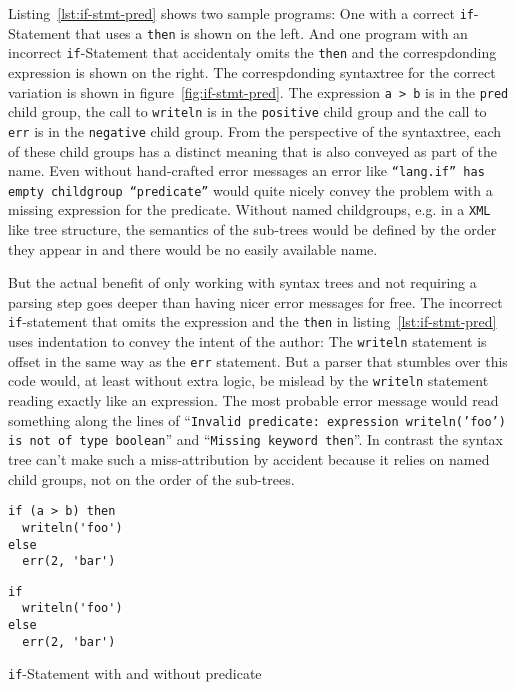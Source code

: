 \documentclass[sigconf,natbib=false,review=true]{acmart}
\begin{document}
Listing~\ref{lst:if-stmt-pred} shows two sample programs: One with a correct \texttt{if}-Statement that uses a \texttt{then} is shown on the left. And one program with an incorrect \texttt{if}-Statement that accidentaly omits the \texttt{then} and the correspdonding expression is shown on the right. The correspdonding syntaxtree for the correct variation is shown in figure~\ref{fig:if-stmt-pred}. The expression \texttt{a > b} is in the \texttt{pred} child group, the call to \texttt{writeln} is in the \texttt{positive} child group and the call to \texttt{err} is in the \texttt{negative} child group. From the perspective of the syntaxtree, each of these child groups has a distinct meaning that is also conveyed as part of the name. Even without hand-crafted error messages an error like \texttt{\enquote{lang.if} has empty childgroup \enquote{predicate}} would quite nicely convey the problem with a missing expression for the predicate. Without named childgroups, e.g. in a \texttt{XML} like tree structure, the semantics of the sub-trees would be defined by the order they appear in and there would be no easily available name.

But the actual benefit of only working with syntax trees and not requiring a parsing step goes deeper than having nicer error messages for free. The incorrect \texttt{if}-statement that omits the expression and the \texttt{then} in listing~\ref{lst:if-stmt-pred} uses indentation to convey the intent of the author: The \texttt{writeln} statement is offset in the same way as the \texttt{err} statement. But a parser that stumbles over this code would, at least without extra logic, be mislead by the \texttt{writeln} statement reading exactly like an expression. The most probable error message would read something along the lines of \enquote{\texttt{Invalid predicate: expression writeln('foo') is not of type boolean}} and \enquote{\texttt{Missing keyword then}}. In contrast the syntax tree can't make such a miss-attribution by accident because it relies on named child groups, not on the order of the sub-trees.

\begin{listing}[H]
\begin{minipage}{.20\textwidth}
\begin{verbatim}
if (a > b) then
  writeln('foo')
else
  err(2, 'bar')
\end{verbatim}
\end{minipage}
\begin{minipage}{.20\textwidth}
\begin{verbatim}
if
  writeln('foo')
else
  err(2, 'bar')
\end{verbatim}
\end{minipage}
\caption{\texttt{if}-Statement with and without predicate}
\label{lst:if-stmt-pred}
\end{listing}
\end{document}
